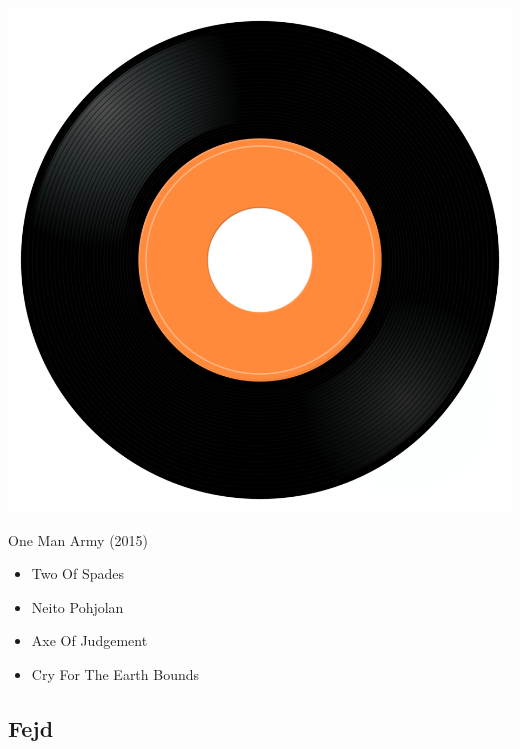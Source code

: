 \begin{minipage}[t]{0.25\textwidth}
\captionsetup{type=figure}
\includegraphics[width=\textwidth]{Images/cover.png}
\caption*{One Man Army (2015)}
\end{minipage}
\begin{minipage}[t]{0.25\textwidth}\vspace{0pt}
\begin{itemize}[nosep,leftmargin=1em,labelwidth=*,align=left]
	\setlength{\itemsep}{0pt}
	\item Two Of Spades
	\item Neito Pohjolan
	\item Axe Of Judgement
	\item Cry For The Earth Bounds
\end{itemize}
\end{minipage}

\subsection{Fejd}

